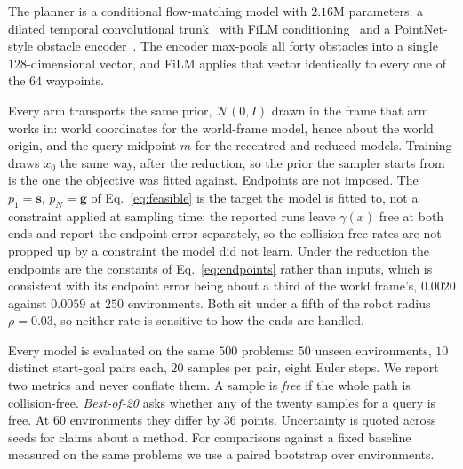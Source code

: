 \documentclass[conference]{IEEEtran}
\newcommand{\svec}{\mathbf{s}}
\newcommand{\gvec}{\mathbf{g}}
\begin{document}
The planner is a conditional flow-matching model with $2.16$M parameters: a
dilated temporal convolutional trunk~\cite{oord2016wavenet} with FiLM
conditioning~\cite{perez2018film}
and a PointNet-style obstacle encoder~\cite{qi2017pointnet}. The encoder
max-pools all forty obstacles into a single $128$-dimensional vector, and FiLM
applies that vector identically to every one of the $64$ waypoints.

Every arm transports the same prior, $\mathcal{N}(0, I)$ drawn in the frame that
arm works in: world coordinates for the world-frame model, hence about the world
origin, and the query midpoint $m$ for the recentred and reduced models.
Training draws $x_0$ the same way, after the reduction, so the prior the sampler
starts from is the one the objective was fitted against. Endpoints are not
imposed. The $p_1 = \svec$, $p_N = \gvec$ of Eq.~\eqref{eq:feasible} is the
target the model is fitted to, not a constraint applied at sampling time: the
reported runs leave $\gamma(x)$ free at both ends and report the endpoint error
separately, so the collision-free rates are not propped up by a constraint the
model did not learn. Under the reduction the endpoints are the constants of
Eq.~\eqref{eq:endpoints} rather than inputs, which is consistent with its
endpoint error being about a third of the world frame's, $0.0020$ against
$0.0059$ at $250$ environments. Both sit under a fifth of the robot radius
$\rho = 0.03$, so neither rate is sensitive to how the ends are handled.

Every model is evaluated on the same $500$ problems: $50$ unseen environments,
$10$ distinct start-goal pairs each, $20$ samples per pair, eight Euler steps. We
report two metrics and never conflate them. A sample is \emph{free} if the whole
path is collision-free. \emph{Best-of-20} asks whether any of the twenty samples
for a query is free. At $60$ environments they differ by $36$ points. Uncertainty is quoted
across seeds for claims about a method. For comparisons against a fixed baseline
measured on the same problems we use a paired bootstrap over environments.
\end{document}

